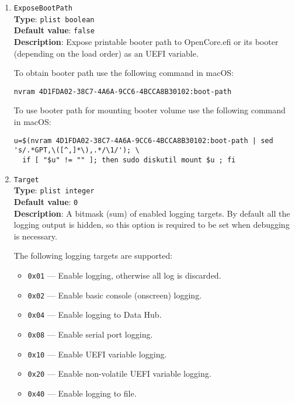 \documentclass[]{article}
\providecommand{\tightlist}{%
  \setlength{\itemsep}{0pt}\setlength{\parskip}{0pt}}
\begin{document}
\begin{enumerate}
\item
  \texttt{ExposeBootPath}\\
  \textbf{Type}: \texttt{plist\ boolean}\\
  \textbf{Default value}: \texttt{false}\\
  \textbf{Description}: Expose printable booter path to OpenCore.efi or its booter
  (depending on the load order) as an UEFI variable.

  To obtain booter path use the following command in macOS:
\begin{lstlisting}[label=nvrampath, style=ocbash]
nvram 4D1FDA02-38C7-4A6A-9CC6-4BCCA8B30102:boot-path
\end{lstlisting}

  To use booter path for mounting booter volume use the following command in macOS:
\begin{lstlisting}[label=nvrampathmount, style=ocbash]
u=$(nvram 4D1FDA02-38C7-4A6A-9CC6-4BCCA8B30102:boot-path | sed 's/.*GPT,\([^,]*\),.*/\1/'); \
  if [ "$u" != "" ]; then sudo diskutil mount $u ; fi
\end{lstlisting}


\item
  \texttt{Target}\\
  \textbf{Type}: \texttt{plist\ integer}\\
  \textbf{Default value}: \texttt{0}\\
  \textbf{Description}: A bitmask (sum) of enabled logging targets.
  By default all the logging output is hidden, so this option is
  required to be set when debugging is necessary.

  The following logging targets are supported:

  \begin{itemize}
  \tightlist
    \item \texttt{0x01} --- Enable logging, otherwise all log is discarded.
    \item \texttt{0x02} --- Enable basic console (onscreen) logging.
    \item \texttt{0x04} --- Enable logging to Data Hub.
    \item \texttt{0x08} --- Enable serial port logging.
    \item \texttt{0x10} --- Enable UEFI variable logging.
    \item \texttt{0x20} --- Enable non-volatile UEFI variable logging.
    \item \texttt{0x40} --- Enable logging to file.
  \end{itemize}


\end{enumerate}
\end{document}

